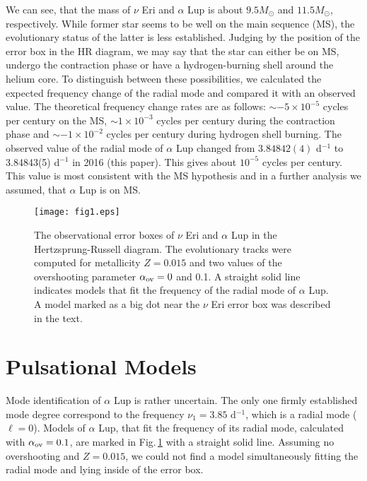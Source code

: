 \documentclass{ptapap}
\begin{document}
We can see, that the mass of $\nu$ Eri and $\alpha$ Lup is about $9.5M_{\odot}$ and $11.5M_{\odot}$, respectively. While former star seems to be well on the main sequence (MS), the evolutionary status of the latter is less established. Judging  by the position of the error box in the HR diagram, we may say that the star can either be on MS, undergo the contraction phase or have a hydrogen-burning shell around the helium core. To distinguish between these possibilities, we calculated the expected frequency change of the radial mode and compared it with an observed value. The theoretical frequency change rates are as follows: $\sim-5\times10^{-5}$ cycles per century on the MS, $\sim1\times10^{-3}$ cycles per century during the contraction phase and $\sim-1\times 10^{-2}$ cycles per century during hydrogen shell burning. The observed value of the radial mode of $\alpha$ Lup changed from $3.84842(4)$ d$^{-1}$ \citep{Lampens1982} to 3.84843(5) d$^{-1}$ in 2016 (this paper). This gives about $10^{-5}$ cycles per century. This value is most consistent with the MS hypothesis and in a further analysis we assumed, that $\alpha$ Lup is on MS.


\begin{SCfigure}
\centering
\texttt{[image: fig1.eps]}
\caption{The observational error boxes of $\nu$ Eri and $\alpha$ Lup in the  Hertzsprung-Russell diagram. The evolutionary tracks were computed for metallicity $Z = 0.015$ and two values of the overshooting parameter $\alpha_{\rm{ov}}=0$ and 0.1. A straight solid line indicates models that fit the frequency of the radial mode of $\alpha$ Lup. A model marked as a big dot near the $\nu$ Eri error box was described in the text.}

\label{fig:HR}
\end{SCfigure}

\section{Pulsational Models}
\label{s3}

Mode identification of $\alpha$ Lup is rather uncertain. The only one firmly established mode degree correspond to the frequency $\nu_1=3.85$ d$^{-1}$, which is a radial mode ($\ell=0$).
Models of $\alpha$ Lup, that fit the frequency of its radial mode, calculated with $\alpha_{\rm{ov}}=0.1$, are marked in Fig.\,\ref{fig:HR} with a straight solid line. Assuming no overshooting and $Z=0.015$, we could not find a model simultaneously fitting the radial mode and lying inside of the error box.
\end{document}
